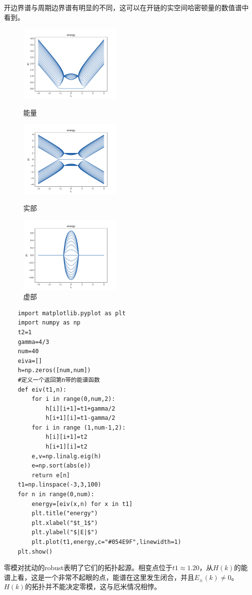 \documentclass{article}
\begin{document}
开边界谱与周期边界谱有明显的不同，这可以在开链的实空间哈密顿量的数值谱中看到。
\begin{figure}[htbp]
\centering
\begin{minipage}[t]{0.3\textwidth}
\centering
\includegraphics[width=2in]{Figure_1.pdf}
\caption{能量}
\end{minipage}
\begin{minipage}[t]{0.3\textwidth}
\centering
\includegraphics[width=2in]{Figure_2.pdf}
\caption{实部}
\end{minipage}
\begin{minipage}[t]{0.3\textwidth}
    \centering
    \includegraphics[width=2in]{Figure_3.pdf}
    \caption{虚部}
    \end{minipage}
\end{figure}
\begin{lstlisting}
    import matplotlib.pyplot as plt
    import numpy as np
    t2=1
    gamma=4/3
    num=40
    eiva=[]
    h=np.zeros([num,num])
    #定义一个返回第n带的能谱函数
    def eiv(t1,n):
        for i in range(0,num,2):
            h[i][i+1]=t1+gamma/2
            h[i+1][i]=t1-gamma/2
        for i in range (1,num-1,2):
            h[i][i+1]=t2
            h[i+1][i]=t2
        e,v=np.linalg.eig(h)
        e=np.sort(abs(e))
        return e[n]
    t1=np.linspace(-3,3,100)
    for n in range(0,num):
        energy=[eiv(x,n) for x in t1]
        plt.title("energy") 
        plt.xlabel("$t_1$") 
        plt.ylabel("$|E|$") 
        plt.plot(t1,energy,c="#054E9F",linewidth=1)
    plt.show()
\end{lstlisting}
零模对扰动的robust表明了它们的拓扑起源。相变点位于$t1\approx 1.20$，从$H(k)$的能谱上看，这是一个非常不起眼的点，能谱在这里发生闭合，并且$E_\pm(k)\neq0$。$H(k)$的拓扑并不能决定零模，这与厄米情况相悖。
\end{document}
